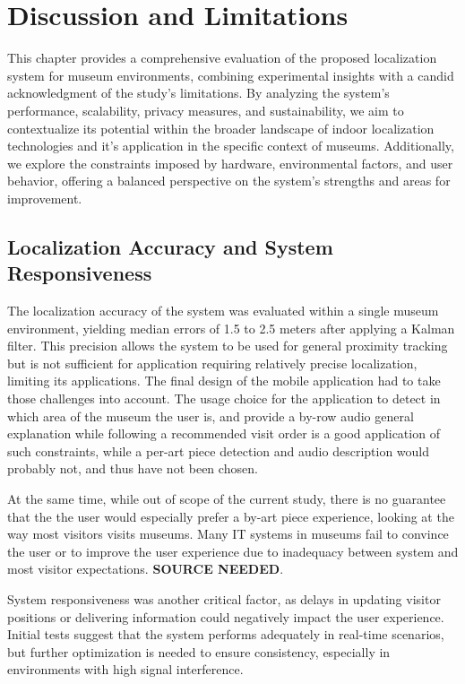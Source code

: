 \chapter{Discussion and Limitations}
\label{chap:discussion}

This chapter provides a comprehensive evaluation of the proposed localization system for museum environments, combining experimental insights with a candid acknowledgment of the study’s limitations. By analyzing the system’s performance, scalability, privacy measures, and sustainability, we aim to contextualize its potential within the broader landscape of indoor localization technologies and it's application in the specific context of museums. Additionally, we explore the constraints imposed by hardware, environmental factors, and user behavior, offering a balanced perspective on the system’s strengths and areas for improvement.

\section{Localization Accuracy and System Responsiveness}
The localization accuracy of the system was evaluated within a single museum environment, yielding median errors of 1.5 to 2.5 meters after applying a Kalman filter. This precision allows the system to be used for general proximity tracking but is not sufficient for application requiring relatively precise localization, limiting its applications. The final design of the mobile application had to take those challenges into account. The usage choice for the application to detect in which area of the museum the user is, and provide a by-row audio general explanation while following a recommended visit order is a good application of such constraints, while a per-art piece detection and audio description would probably not, and thus have not been chosen.

At the same time, while out of scope of the current study, there is no guarantee that the the user would especially prefer a by-art piece experience, looking at the way most visitors visits museums. Many IT systems in museums fail to convince the user or to improve the user experience due to inadequacy between system and most visitor expectations. \textbf{SOURCE NEEDED}.

System responsiveness was another critical factor, as delays in updating visitor positions or delivering information could negatively impact the user experience. Initial tests suggest that the system performs adequately in real-time scenarios, but further optimization is needed to ensure consistency, especially in environments with high signal interference.

